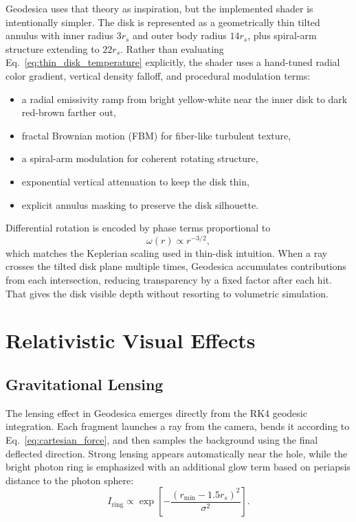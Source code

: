 \documentclass[12pt]{article}
\begin{document}
Geodesica uses that theory as inspiration, but the implemented shader is intentionally simpler. The disk is represented as a geometrically thin tilted annulus with inner radius $3r_s$ and outer body radius $14r_s$, plus spiral-arm structure extending to $22r_s$. Rather than evaluating Eq.~\eqref{eq:thin_disk_temperature} explicitly, the shader uses a hand-tuned radial color gradient, vertical density falloff, and procedural modulation terms:
\begin{itemize}
\item a radial emissivity ramp from bright yellow-white near the inner disk to dark red-brown farther out,
\item fractal Brownian motion (FBM) for fiber-like turbulent texture,
\item a spiral-arm modulation for coherent rotating structure,
\item exponential vertical attenuation to keep the disk thin,
\item explicit annulus masking to preserve the disk silhouette.
\end{itemize}

Differential rotation is encoded by phase terms proportional to
\begin{equation}
\omega(r) \propto r^{-3/2},
\label{eq:keplerian_rotation}
\end{equation}
which matches the Keplerian scaling used in thin-disk intuition. When a ray crosses the tilted disk plane multiple times, Geodesica accumulates contributions from each intersection, reducing transparency by a fixed factor after each hit. That gives the disk visible depth without resorting to volumetric simulation.

\section{Relativistic Visual Effects}
\subsection{Gravitational Lensing}
The lensing effect in Geodesica emerges directly from the RK4 geodesic integration. Each fragment launches a ray from the camera, bends it according to Eq.~\eqref{eq:cartesian_force}, and then samples the background using the final deflected direction. Strong lensing appears automatically near the hole, while the bright photon ring is emphasized with an additional glow term based on periapsis distance to the photon sphere:
\begin{equation}
I_{\mathrm{ring}} \propto \exp\!\left[-\frac{(r_{\min} - 1.5r_s)^2}{\sigma^2}\right].
\label{eq:photon_ring_glow}
\end{equation}
\end{document}
